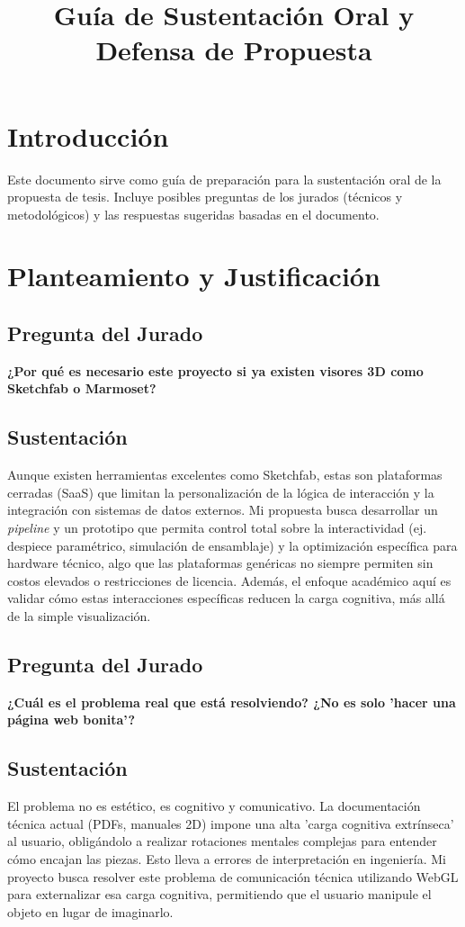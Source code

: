 \documentclass[11pt]{article}
\title{Guía de Sustentación Oral y Defensa de Propuesta}
\author{}
\date{}
\begin{document}
\maketitle

\section*{Introducción}

Este documento sirve como guía de preparación para la sustentación oral de la propuesta de tesis. Incluye posibles preguntas de los jurados (técnicos y metodológicos) y las respuestas sugeridas basadas en el documento.

\section{Planteamiento y Justificación}

\subsection*{Pregunta del Jurado}
\textbf{¿Por qué es necesario este proyecto si ya existen visores 3D como Sketchfab o Marmoset?}

\subsection*{Sustentación}
Aunque existen herramientas excelentes como Sketchfab, estas son plataformas cerradas (SaaS) que limitan la personalización de la lógica de interacción y la integración con sistemas de datos externos. Mi propuesta busca desarrollar un \textit{pipeline} y un prototipo que permita control total sobre la interactividad (ej. despiece paramétrico, simulación de ensamblaje) y la optimización específica para hardware técnico, algo que las plataformas genéricas no siempre permiten sin costos elevados o restricciones de licencia. Además, el enfoque académico aquí es validar cómo estas interacciones específicas reducen la carga cognitiva, más allá de la simple visualización.

\subsection*{Pregunta del Jurado}
\textbf{¿Cuál es el problema real que está resolviendo? ¿No es solo 'hacer una página web bonita'?}

\subsection*{Sustentación}
El problema no es estético, es cognitivo y comunicativo. La documentación técnica actual (PDFs, manuales 2D) impone una alta 'carga cognitiva extrínseca' al usuario, obligándolo a realizar rotaciones mentales complejas para entender cómo encajan las piezas. Esto lleva a errores de interpretación en ingeniería. Mi proyecto busca resolver este problema de comunicación técnica utilizando WebGL para externalizar esa carga cognitiva, permitiendo que el usuario manipule el objeto en lugar de imaginarlo.
\end{document}
